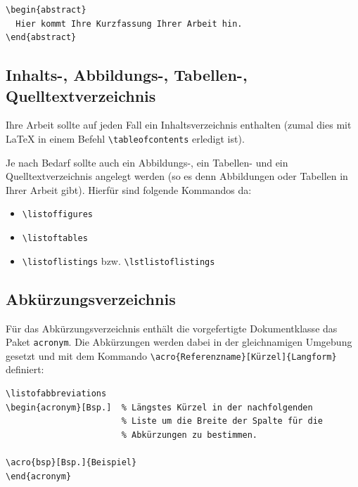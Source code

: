 \documentclass[pdftex,a4paper]{scrartcl}
\begin{document}
\begin{verbatim}
\begin{abstract}
  Hier kommt Ihre Kurzfassung Ihrer Arbeit hin.
\end{abstract}
\end{verbatim}


\subsection{Inhalts-, Abbildungs-, Tabellen-, Quelltextverzeichnis}

Ihre Arbeit sollte auf jeden Fall ein Inhaltsverzeichnis enthalten (zumal dies mit 
\LaTeX{} in einem Befehl \verb+\tableofcontents+ erledigt ist).

Je nach Bedarf sollte auch ein Abbildungs-, ein Tabellen- und ein Quelltextverzeichnis angelegt werden (so es denn Abbildungen oder Tabellen in Ihrer Arbeit gibt). Hierfür sind folgende Kommandos da:
\begin{itemize}
  \item \verb+\listoffigures+
  \item \verb+\listoftables+
  \item \verb+\listoflistings+ bzw. \verb+\lstlistoflistings+
\end{itemize}




\subsection{Abkürzungsverzeichnis}
Für das Abkürzungsverzeichnis enthält die vorgefertigte Dokumentklasse das Paket
\verb+acronym+. Die Abkürzungen werden dabei in der gleichnamigen Umgebung gesetzt 
und mit dem Kommando \verb+\acro{Referenzname}[Kürzel]{Langform}+ definiert:

\begin{verbatim}
\listofabbreviations
\begin{acronym}[Bsp.]  % Längstes Kürzel in der nachfolgenden
                       % Liste um die Breite der Spalte für die
                       % Abkürzungen zu bestimmen.

\acro{bsp}[Bsp.]{Beispiel}
\end{acronym}
\end{verbatim}
\end{document}
